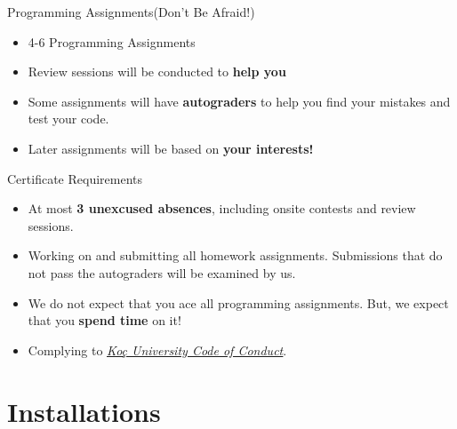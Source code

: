 		\begin{frame}{Programming Assignments\pause (Don't Be Afraid!)}
			\begin{itemize}
				\LARGE
				\item 4-6 Programming Assignments
				\pause
				\item Review sessions will be conducted to \textbf{help you}
				\pause
				\item Some assignments will have \textbf{autograders} to help you find your mistakes and test your code.
				\pause
				\item Later assignments will be based on \textbf{your interests!}
			\end{itemize}

			\begin{center}
			\end{center}
			\LARGE
			
		\end{frame}

		\begin{frame}{Certificate Requirements}
			\pause
			\begin{itemize}
				\LARGE
				\item At most \textbf{3 unexcused absences}, including onsite contests and review sessions.
				\pause
				\item Working on and submitting all homework assignments. Submissions that do not pass the autograders will be examined by us.
				\pause
				\item We do not expect that you ace all programming assignments. But, we expect that you \textbf{spend time} on it!
				\pause
				\item Complying to \href{https://vpaa.ku.edu.tr/academic/student-code-of-conduct}{\underline{\textit{Koç University Code of Conduct}}}. 
			\end{itemize}
		\end{frame}

	\section{Installations}

